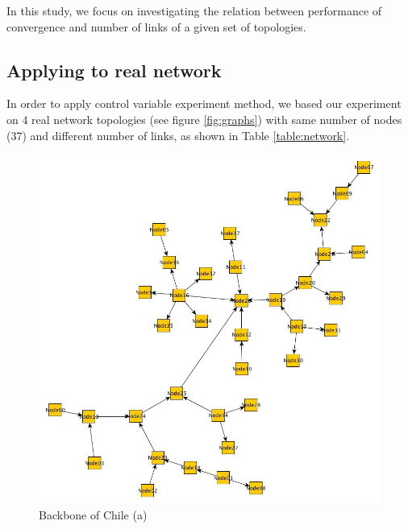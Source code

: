 In this study, we focus on investigating the relation between performance of convergence and number of links of a given set of topologies. 

\subsection{Applying to real network}
In order to apply control variable experiment method, we based our experiment on 4 real network topologies (see figure \ref{fig:graphs}) with same number of nodes (37) and different number of links, as shown in Table \ref{table:network}.

\begin{figure}[h!]
   \begin{minipage}[t]{0.4\textwidth}
      \vspace{0pt}
      \includegraphics[width=\linewidth]{Reuna.jpg}
      Backbone of Chile (a)
   \end{minipage}
   \hfill
   \begin{minipage}[t]{0.4\textwidth}
      \vspace{0pt}

\end{minipage}
\end{figure}
